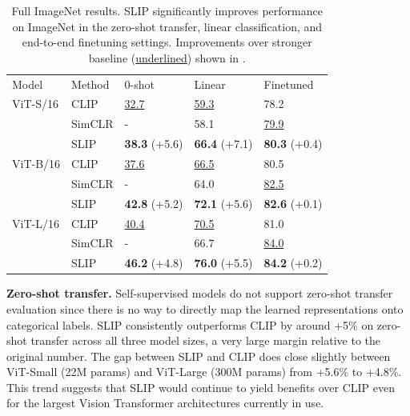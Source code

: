 \documentclass[10pt,twocolumn,letterpaper]{article}
\newcommand{\tablestyle}[2]{\setlength{\tabcolsep}{#1}\renewcommand{\arraystretch}{#2}\centering\footnotesize}
\renewcommand{\paragraph}[1]{\vspace{1.25mm}\noindent\textbf{#1}}
\begin{document}
\begin{table}[h]
\tablestyle{2pt}{1.1}
\setlength{\tabcolsep}{6pt}
\begin{tabular}{l l l l l}
Model & Method & 0-shot & Linear & Finetuned \\
\shline
ViT-S/16 & CLIP & \underline{32.7} & \underline{59.3} & 78.2 \\
 & SimCLR & - & 58.1 & \underline{79.9} \\
 & SLIP & \textbf{38.3} \color{Green}(+5.6) & \textbf{66.4} \color{Green}(+7.1) & \textbf{80.3} \color{Green}(+0.4) \\
\hline
ViT-B/16 & CLIP & \underline{37.6} & \underline{66.5} & 80.5 \\
 & SimCLR & - & 64.0 & \underline{82.5} \\
 & SLIP & \textbf{42.8} \color{Green}(+5.2) & \textbf{72.1} \color{Green}(+5.6) & \textbf{82.6} \color{Green}(+0.1) \\
\hline
ViT-L/16 & CLIP & \underline{40.4} & \underline{70.5} & 81.0 \\
 & SimCLR & - & 66.7 & \underline{84.0} \\
 & SLIP & \textbf{46.2} \color{Green}(+4.8) & \textbf{76.0} \color{Green}(+5.5) & \textbf{84.2} \color{Green}(+0.2) \\
\end{tabular}
\vspace{-.5em}
\caption{Full ImageNet results.
SLIP significantly improves performance on ImageNet in the zero-shot transfer, linear classification, and end-to-end finetuning settings.
Improvements over stronger baseline (\underline{underlined}) shown in \color{Green}{green}.
}
\label{tab:table1}
\end{table}

\paragraph{Zero-shot transfer.} Self-supervised models do not support zero-shot transfer evaluation since there is no way to directly map the learned representations onto categorical labels.
SLIP consistently outperforms CLIP by around +5\% on zero-shot transfer across all three model sizes, a very large margin relative to the original number.
The gap between SLIP and CLIP does close slightly between ViT-Small (22M params) and ViT-Large (300M params) from +5.6\% to +4.8\%.
This trend suggests that SLIP would continue to yield benefits over CLIP even for the largest Vision Transformer architectures currently in use.
\end{document}
